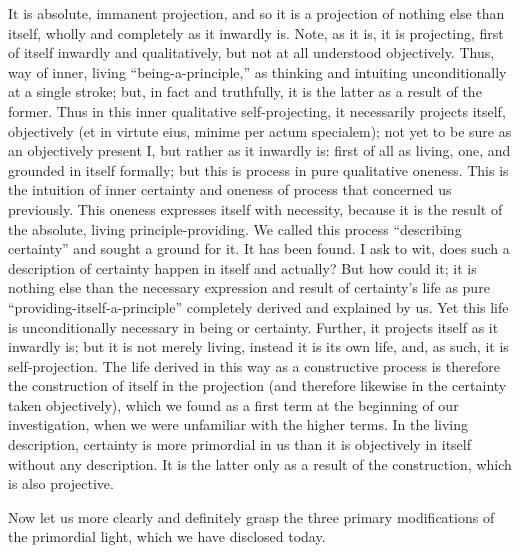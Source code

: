 It is absolute, immanent projection,
and so it is a projection of nothing else than itself,
wholly and completely as it inwardly is.
Note, as it is, it is projecting,
first of itself inwardly and qualitatively,
but not at all understood objectively.
Thus, way of inner, living “being-a-principle,”
as thinking and intuiting unconditionally at a single stroke;
but, in fact and truthfully, it is the latter as a result of the former.
Thus in this inner qualitative self-projecting,
it necessarily projects itself, objectively
(et in virtute eius, minime per actum specialem);
not yet to be sure as an objectively present I,
but rather as it inwardly is:
first of all as living, one, and grounded in itself formally;
but this is process in pure qualitative oneness.
This is the intuition of inner certainty
and oneness of process that concerned us previously.
This oneness expresses itself with necessity,
because it is the result of
the absolute, living principle-providing.
We called this process “describing certainty”
and sought a ground for it.
It has been found.
I ask to wit, does such a description of certainty
happen in itself and actually?
But how could it; it is nothing else than
the necessary expression and result of certainty's life
as pure “providing-itself-a-principle”
completely derived and explained by us.
Yet this life is unconditionally necessary in being or certainty.
Further, it projects itself as it inwardly is;
but it is not merely living, instead it is its own life,
and, as such, it is self-projection.
The life derived in this way as a constructive process is
therefore the construction of itself in the projection
(and therefore likewise in the certainty taken objectively),
which we found as a first term at the beginning of our investigation,
when we were unfamiliar with the higher terms.
In the living description, certainty is
more primordial in us than it is
objectively in itself without any description.
It is the latter only as
a result of the construction,
which is also projective.

Now let us more clearly and definitely grasp
the three primary modifications of the primordial light,
which we have disclosed today.

